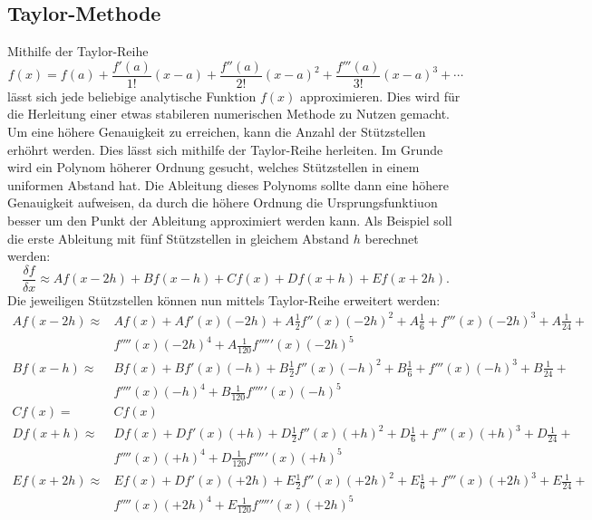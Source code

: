 \subsection{Taylor-Methode}
Mithilfe der Taylor-Reihe 
\begin{equation}
f(x) = f(a)+{\frac {f'(a)}{1!}}(x-a)+{\frac {f''(a)}{2!}}(x-a)^{2}+{\frac {f'''(a)}{3!}}(x-a)^{3}+\cdots
\label{ableitung:eqn:taylorseries}
\end{equation}
lässt sich jede beliebige analytische Funktion $f(x)$ approximieren. Dies wird für die Herleitung einer etwas stabileren numerischen Methode zu Nutzen gemacht.
Um eine höhere Genauigkeit zu erreichen, kann die Anzahl der Stützstellen erhöhrt werden. 
Dies lässt sich mithilfe der Taylor-Reihe herleiten.
Im Grunde wird ein Polynom höherer Ordnung gesucht, welches Stützstellen in einem uniformen Abstand hat.
Die Ableitung dieses Polynoms sollte dann eine höhere Genauigkeit aufweisen, da durch die höhere Ordnung die Ursprungsfunktiuon besser um den Punkt der Ableitung approximiert werden kann.
Als Beispiel soll die erste Ableitung mit fünf Stützstellen in gleichem Abstand $h$ berechnet werden:
\begin{equation}
\frac{\delta f}{\delta x} \approx Af(x-2h) + Bf(x-h) + Cf(x) + Df(x+h) + Ef(x+2h) \text{.}
\end{equation}
Die jeweiligen Stützstellen können nun mittels Taylor-Reihe erweitert werden:
\begin{equation}
\begin{split}
Af(x-2h) \approx & Af(x) + Af'(x)(-2h) + A\frac{1}{2}f''(x)(-2h)^2+A\frac{1}{6} + f'''(x)(-2h)^3+A\frac{1}{24} + \\ 
& f''''(x)(-2h)^4 + A\frac{1}{120}f'''''(x)(-2h)^5 \\
Bf(x-h) \approx & Bf(x) + Bf'(x)(-h) + B\frac{1}{2}f''(x)(-h)^2+B\frac{1}{6} + f'''(x)(-h)^3+B\frac{1}{24} + \\ 
& f''''(x)(-h)^4 + B\frac{1}{120}f'''''(x)(-h)^5 \\
Cf(x) = & Cf(x) \\
Df(x+h) \approx & Df(x) + Df'(x)(+h) + D\frac{1}{2}f''(x)(+h)^2+D\frac{1}{6} + f'''(x)(+h)^3+D\frac{1}{24} + \\ 
& f''''(x)(+h)^4 + D\frac{1}{120}f'''''(x)(+h)^5 \\
Ef(x+2h) \approx & Ef(x) + Df'(x)(+2h) + E\frac{1}{2}f''(x)(+2h)^2+E\frac{1}{6} + f'''(x)(+2h)^3+E\frac{1}{24} + \\ 
& f''''(x)(+2h)^4 + E\frac{1}{120}f'''''(x)(+2h)^5
\end{split}
\end{equation}
